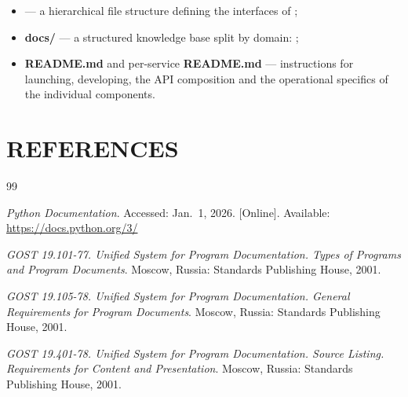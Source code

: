 \documentclass[12pt,a4paper]{extarticle}
\begin{document}
\begin{hseExample}
\begin{itemize}[leftmargin=1.25cm]
    \item \textbf{} --- a hierarchical file structure defining the interfaces of ;
    \item \textbf{docs/} --- a structured knowledge base split by domain: ;
    \item \textbf{README.md} and per-service \textbf{README.md} --- instructions for launching, developing, the API composition and the operational specifics of the individual components.
\end{itemize}
\end{hseExample}

\clearpage
\pagestyle{appendix}

\section*{REFERENCES}

\renewcommand{\refname}{}
\begin{thebibliography}{99}
\vspace{-1cm}

\emph{Python Documentation}. Accessed: Jan.~1, 2026. [Online]. Available: \url{https://docs.python.org/3/}

\emph{GOST 19.101-77. Unified System for Program Documentation. Types of Programs and Program Documents}. Moscow, Russia: Standards Publishing House, 2001.

\emph{GOST 19.105-78. Unified System for Program Documentation. General Requirements for Program Documents}. Moscow, Russia: Standards Publishing House, 2001.

\emph{GOST 19.401-78. Unified System for Program Documentation. Source Listing. Requirements for Content and Presentation}. Moscow, Russia: Standards Publishing House, 2001.

\end{thebibliography}

\clearpage



\end{document}
